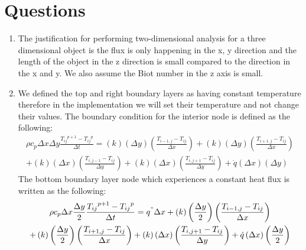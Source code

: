 \section{Questions}


\begin{enumerate}
    \item The justification for performing two-dimensional analysis for a three dimensional object is the flux is only happening in the x, y direction and the length of the object in the z direction is small compared to the direction in the x and y. We also assume the Biot number in the z axis is  small.
    \item We defined the top and right boundary layers as having constant temperature therefore in the implementation we will set their temperature and not change their values. The boundary condition for the interior node is defined as the following:
    \begin{equation}
    \begin{gathered}
        \rho { c }_{ p }\Delta x\Delta y\frac { { { { T }_{ ij } }^{ p+1 }-{ { T }_{ ij } }^{ p } } }{ \Delta t } =\left( k \right) \left( \Delta y \right) \left( \frac { { T }_{ i-1,j }-{ T }_{ ij } }{ \Delta x }  \right) +\left( k \right) \left( \Delta y \right) \left( \frac { { T }_{ i+1,j }-{ T }_{ ij } }{ \Delta x }  \right) \\
        +\left( k \right) \left( \Delta x \right) \left( \frac { { T }_{ i,j-1 }-{ T }_{ ij } }{ \Delta y }  \right) +\left( k \right) \left( \Delta x \right) \left( \frac { { T }_{ i,j+1 }-{ T }_{ ij } }{ \Delta y }  \right) +\dot { q } \left( \Delta x \right) \left( \Delta y \right) 
    \end{gathered}
    \end{equation}
    The bottom boundary layer node which experiences a constant heat flux is written as the following:
    \begin{equation}
    \begin{gathered}
        \rho { c }_{ p }\Delta x\frac { \Delta y }{ 2 } \frac { { { { T }_{ ij } }^{ p+1 }-{ { T }_{ ij } }^{ p } } }{ \Delta t } ={ q }^{ " }\Delta x+\left( k \right) \left( \frac { \Delta y }{ 2 }  \right) \left( \frac { { T }_{ i-1,j }-{ T }_{ ij } }{ \Delta x }  \right) \\
        +\left( k \right) \left( \frac { \Delta y }{ 2 }  \right) \left( \frac { { T }_{ i+1,j }-{ T }_{ ij } }{ \Delta x }  \right) +\left( k \right) \left( \Delta x \right) \left( \frac { { T }_{ i,j+1 }-{ T }_{ ij } }{ \Delta y }  \right)+\dot { q } \left( \Delta x \right) \left( \frac { \Delta y }{ 2 }  \right) 

\end{gathered}
\end{equation}
\end{enumerate}
